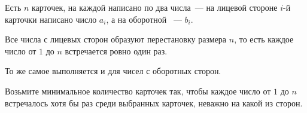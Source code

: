 Есть $n$ карточек, на каждой написано по два числа~--- на лицевой стороне $i$-й карточки написано число $a_i$, а на оборотной ~--- $b_i$.

Все числа с лицевых сторон образуют перестановку размера $n$, то есть каждое число от $1$ до $n$ встречается ровно один раз.

То же самое выполняется и для чисел с оборотных сторон.

Возьмите минимальное количество карточек так, чтобы каждое число от $1$ до $n$ встречалось хотя бы раз среди выбранных карточек, неважно на какой из сторон.